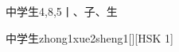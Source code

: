 \begin{entry}{中学生}{4,8,5}{⼁、⼦、⽣}
  \begin{phonetics}{中学生}{zhong1xue2sheng1}[][HSK 1]
  \end{phonetics}
\end{entry}
